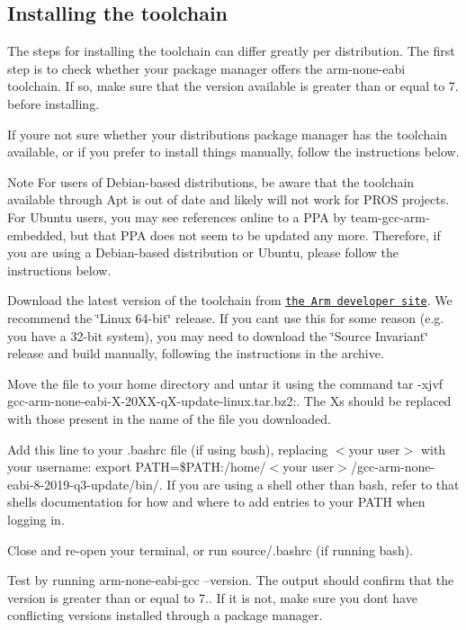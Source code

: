 \subsection*{Installing the toolchain}

The steps for installing the toolchain can differ greatly per distribution. The first step is to check whether your package manager offers the arm-\/none-\/eabi toolchain. If so, make sure that the version available is greater than or equal to 7. before installing.

If you\textquotesingle{}re not sure whether your distribution\textquotesingle{}s package manager has the toolchain available, or if you prefer to install things manually, follow the instructions below.

\begin{DoxyNote}{Note}
For users of Debian-\/based distributions, be aware that the toolchain available through Apt is out of date and likely will not work for P\+R\+OS projects. For Ubuntu users, you may see references online to a P\+PA by team-\/gcc-\/arm-\/embedded, but that P\+PA does not seem to be updated any more. Therefore, if you are using a Debian-\/based distribution or Ubuntu, please follow the instructions below.
\end{DoxyNote}

\begin{DoxyEnumerate}
\item Download the latest version of the toolchain from \href{https://developer.arm.com/tools-and-software/open-source-software/developer-tools/gnu-toolchain/gnu-rm/downloads}{\tt the Arm developer site}. We recommend the \char`\"{}\+Linux 64-\/bit\char`\"{} release. If you can\textquotesingle{}t use this for some reason (e.\+g. you have a 32-\/bit system), you may need to download the \char`\"{}\+Source Invariant\char`\"{} release and build manually, following the instructions in the archive.
\item Move the file to your home directory and untar it using the command tar -\/xjvf gcc-\/arm-\/none-\/eabi-\/\+X-\/20\+X\+X-\/q\+X-\/update-\/linux.\+tar.\+bz2\+:. The Xs should be replaced with those present in the name of the file you downloaded.
\item Add this line to your .bashrc file (if using bash), replacing $<$your user$>$ with your username\+: export P\+A\+TH=\$P\+A\+TH\+:/home/$<$your user$>$/gcc-\/arm-\/none-\/eabi-\/8-\/2019-\/q3-\/update/bin/. If you are using a shell other than bash, refer to that shell\textquotesingle{}s documentation for how and where to add entries to your P\+A\+TH when logging in.
\item Close and re-\/open your terminal, or run source/.bashrc (if running bash).
\item Test by running arm-\/none-\/eabi-\/gcc --version. The output should confirm that the version is greater than or equal to 7.. If it is not, make sure you don\textquotesingle{}t have conflicting versions installed through a package manager.
\end{DoxyEnumerate}

